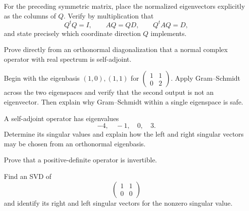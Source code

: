 \begin{exercise}[Core] For the preceding symmetric matrix, place the normalized
eigenvectors explicitly as the columns of \(Q\).  Verify by multiplication
that
\[
Q^tQ=I,\qquad AQ=QD,\qquad Q^tAQ=D,
\]
and state precisely which coordinate direction \(Q\) implements.
\end{exercise}
\begin{exercise}[Core] Prove directly from an orthonormal diagonalization
that a normal complex operator with real spectrum is self-adjoint.\end{exercise}
\begin{exercise}[Further] Begin with the eigenbasis
\((1,0),(1,1)\) for
\(\begin{pmatrix}1&1\\0&2\end{pmatrix}\).  Apply Gram--Schmidt across the
two eigenspaces and verify that the second output is not an eigenvector.
Then explain why Gram--Schmidt within a single eigenspace is safe.\end{exercise}
\begin{exercise}[Further] A self-adjoint operator has eigenvalues
\[
-4,\quad -1,\quad 0,\quad 3.
\]
Determine its singular values and explain how the left and
right singular vectors may be chosen from an orthonormal eigenbasis.\end{exercise}
\begin{exercise}[Further] Prove that a positive-definite operator is
invertible.\end{exercise}
\begin{exercise} Find an SVD of
\[
\begin{pmatrix}1&1\\0&0\end{pmatrix}
\]
and identify its right and left singular vectors for the nonzero singular
value.\end{exercise}

